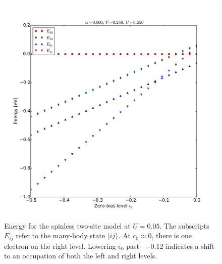 \begin{figure}[!bt]
    \centering
    \includegraphics[height=.45\textheight]{pdf/energy/perrin_distribution_u1.pdf}
    \caption{Energy for the spinless two-site model at $U=0.05$. The subscripts $E_{ij}$ refer to the many-body state $\ket{i j}$. At $\epsilon_0 \approx 0$, there is one electron on the right level. Lowering $\epsilon_0$ past ~$-0.12$ indicates a shift to an occupation of both the left and right levels.  }
    \label{fig:perrinenergy1}
\end{figure}
